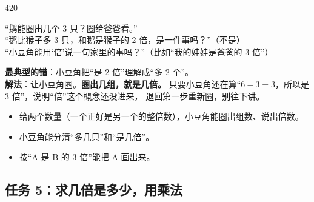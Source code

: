 \begin{lesson}{4}{20}
\begin{saybox}
“鹅能圈出几个 3 只？圈给爸爸看。”\\
“鹅比猴子多 3 只，和鹅是猴子的 2 倍，是一件事吗？”（不是）\\
“小豆角能用‘倍’说一句家里的事吗？”（比如“我的娃娃是爸爸的 3 倍”）
\end{saybox}

\begin{pitbox}
\textbf{最典型的错}：小豆角把“是 2 倍”理解成“多 2 个”。\\
\textbf{解法}：让小豆角圈。\textbf{圈出几组，就是几倍。}
只要小豆角还在算“$6-3=3$，所以是 3 倍”，说明“倍”这个概念还没进来，
退回第一步重新圈，别往下讲。
\end{pitbox}

\begin{passbox}
\begin{itemize}
  \item 给两个数量（一个正好是另一个的整倍数），小豆角能圈出组数、说出倍数。
  \item 小豆角能分清“多几只”和“是几倍”。
  \item 按“A 是 B 的 3 倍”能把 A 画出来。
\end{itemize}
\end{passbox}
\end{lesson}

\subsection{任务 5：求几倍是多少，用乘法}

